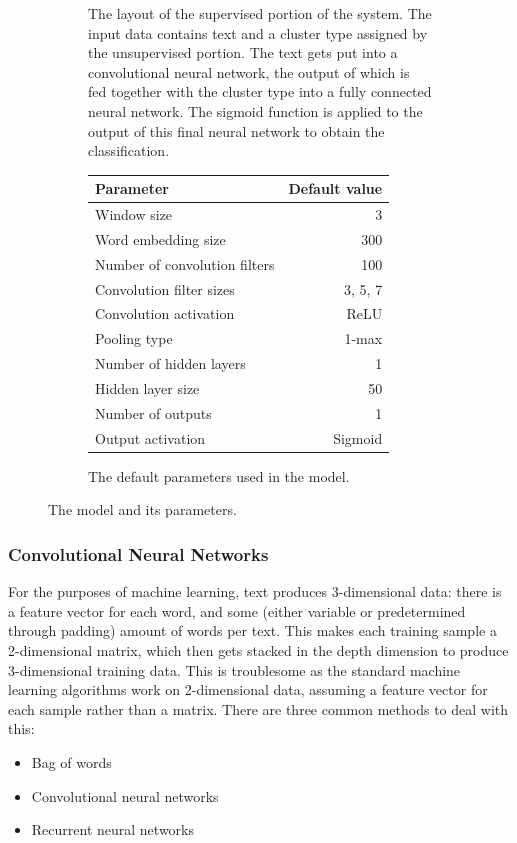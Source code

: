 \begin{figure}[htbp]
\begin{subfigure}[b]{0.45\textwidth}
    \caption{The layout of the supervised portion of the system. The input data
      contains text and a cluster type assigned by the unsupervised portion. The
      text gets put into a convolutional neural network, the output of which is
      fed together with the cluster type into a fully connected neural network.
      The sigmoid function is applied to the output of this final neural network
    to obtain the classification.}
    \label{fig:nn_layout}
  \end{subfigure}
  \hspace{0.05\textwidth}
  \begin{subfigure}[b]{0.45\textwidth}
    \centering
    \begin{tabular}{lr}
      \toprule
      Parameter & Default value \\
      \midrule
      Window size & 3 \\
      Word embedding size & 300 \\
      Number of convolution filters & 100 \\
      Convolution filter sizes & 3, 5, 7 \\
      Convolution activation & ReLU \\
      Pooling type & 1-max \\
      Number of hidden layers & 1 \\
      Hidden layer size & 50 \\
      Number of outputs & 1 \\
      Output activation & Sigmoid \\
      \bottomrule
    \end{tabular}
    \caption{The default parameters used in the model.}
    \label{tbl:params}
  \end{subfigure}
  \caption{The model and its parameters.}
  \label{fig:model_full}
\end{figure}

\subsubsection{Convolutional Neural Networks}
For the purposes of machine learning,
text produces 3-dimensional data: there is a feature vector for each word, and
some (either variable or predetermined through padding) amount of words per
text. This makes each training sample a 2-dimensional matrix, which then gets
stacked in the depth dimension to produce 3-dimensional training data. This is
troublesome as the standard machine learning algorithms work on 2-dimensional
data, assuming a feature vector for each sample rather than a matrix. There are
three common methods to deal with this:
\begin{itemize}
\item Bag of words
\item Convolutional neural networks
\item Recurrent neural networks
\end{itemize}

